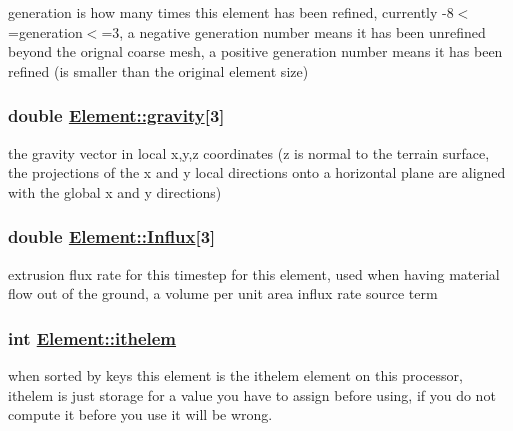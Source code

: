 generation is how many times this element has been refined, currently -8$<$=generation$<$=3, a negative generation number means it has been unrefined beyond the orignal coarse mesh, a positive generation number means it has been refined (is smaller than the original element size) 

\hypertarget{classElement_r40}{
\subsubsection[gravity]{\setlength{\rightskip}{0pt plus 5cm}double \hyperlink{classElement_r40}{Element::gravity}\mbox{[}3\mbox{]}}}
\label{classElement_r40}


the gravity vector in local x,y,z coordinates (z is normal to the terrain surface, the projections of the x and y local directions onto a horizontal plane are aligned with the global x and y directions) 

\hypertarget{classElement_r47}{
\subsubsection[Influx]{\setlength{\rightskip}{0pt plus 5cm}double \hyperlink{classElement_r47}{Element::Influx}\mbox{[}3\mbox{]}}}
\label{classElement_r47}


extrusion flux rate for this timestep for this element, used when having material flow out of the ground, a volume per unit area influx rate source term 

\hypertarget{classElement_r49}{
\subsubsection[ithelem]{\setlength{\rightskip}{0pt plus 5cm}int \hyperlink{classElement_r49}{Element::ithelem}}}
\label{classElement_r49}


when sorted by keys this element is the ithelem element on this processor, ithelem is just storage for a value you have to assign before using, if you do not compute it before you use it will be wrong. 


